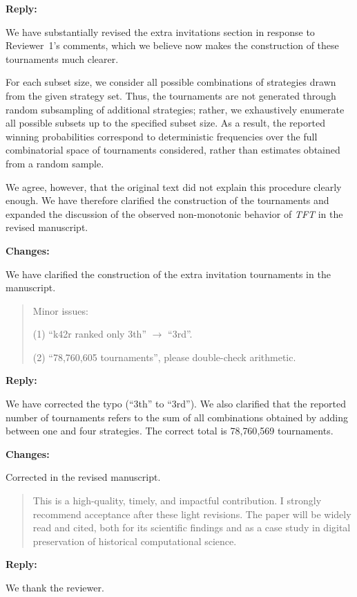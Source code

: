 \documentclass[11pt]{article}
\newcommand{\reply}{
\vspace{0.25em}
{\color{ForestGreen}\textbf{Reply:}}
}
\newcommand{\changes}{
\vspace{0.25em}
{\color{BrickRed}\textbf{Changes:}}
}
\newenvironment{reviewercomment}
{
\vspace{0.5em}
\begin{quote}
\color{NavyBlue}
}
{
\end{quote}
}
\newcommand{\TFT}{\emph{TFT}}
\begin{document}
\reply

We have substantially
revised the extra invitations section in response to Reviewer~1's comments,
which we believe now makes the construction of these tournaments much clearer.

For each subset size, we consider all possible combinations of strategies drawn
from the given strategy set. Thus, the tournaments are not generated through
random subsampling of additional strategies; rather, we exhaustively enumerate
all possible subsets up to the specified subset size. As a result, the reported
winning probabilities correspond to deterministic frequencies over the full
combinatorial space of tournaments considered, rather than estimates obtained
from a random sample.

We agree, however, that the original text did not explain this procedure
clearly enough. We have therefore clarified the construction of the tournaments
and expanded the discussion of the observed non-monotonic behavior of
\TFT{} in the revised manuscript.

\changes

We have clarified the construction of the extra invitation tournaments in the
manuscript.



\begin{reviewercomment}
Minor issues:

(1) ``k42r ranked only 3th'' $\rightarrow$ ``3rd''.

(2) ``78,760,605 tournaments'', please double-check arithmetic.
\end{reviewercomment}

\reply

We have corrected the
typo (``3th'' to ``3rd''). We also clarified that the reported
number of tournaments refers to the sum of all combinations obtained by adding
between one and four strategies. The correct total is
78{,}760{,}569 tournaments.

\changes

Corrected in the revised manuscript.

\begin{reviewercomment}
This is a high-quality, timely, and impactful contribution. I strongly
recommend acceptance after these light revisions. The paper will be widely
read and cited, both for its scientific findings and as a case study in
digital preservation of historical computational science.
\end{reviewercomment}

\reply

We thank the reviewer.
\end{document}
